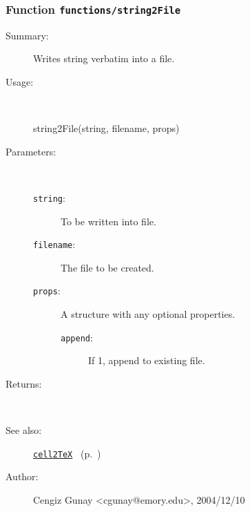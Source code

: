 \subsubsection[Function \texttt{string2File}]{Function \texttt{functions/string2File}}%
%
\label{ref_functions__string2File}%
\hypertarget{ref_functions__string2File}{}%
\begin{description}
\item[Summary:]Writes string verbatim into a file.
%
\item[Usage:]~%
\begin{lyxcode}%
string2File(string, filename, props)
%
\end{lyxcode}%
%
%
\item[Parameters:]~
\begin{description}%
\item[\texttt{string}:]
 To be written into file.
\item[\texttt{filename}:]
 The file to be created.
\item[\texttt{props}:]
 A structure with any optional properties.
\begin{description}%
\item[\texttt{append}:]
 If 1, append to existing file.
\end{description}%
\end{description}%
%
\item[Returns:
]~

%
%
\item[See also:]%
\hyperlink{ref_cell2TeX}{\texttt{cell2TeX}}%
\ (p.~\pageref{ref_cell2TeX})%
%
%
\item[Author:]%
Cengiz Gunay <cgunay@emory.edu>, 2004/12/10
%
\end{description}
\methodline%
